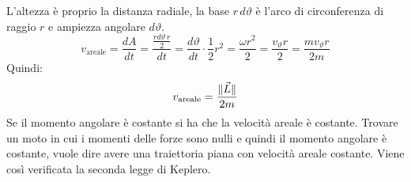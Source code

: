 \documentclass[10pt,a4paper]{book}
\DeclarePairedDelimiter{\norma}{\lVert}{\rVert} %
\begin{document}
\begin{figure}[htpb]
\end{figure}
\FloatBarrier
L'altezza è proprio la distanza radiale, la base $r\,d\vartheta$ è l'arco di circonferenza di raggio $r$ e ampiezza angolare $d\vartheta$.
\[
	v_\text{areale}=\frac{dA}{dt}=\frac{\frac{rd\vartheta\,r}{2}}{dt}=\frac{d\vartheta}{dt}\cdot \frac{1}{2} r^2=\frac{\omega r^2}{2}=\frac{v_\vartheta r}{2}=\frac{mv_\vartheta r}{2m}
\]
Quindi:
\[
	v_\text{areale}=\frac{\norma{\vec{L}}}{2m}
\]
Se il momento angolare è costante si ha che la velocità areale è costante. Trovare un moto in cui i momenti delle forze sono nulli e quindi il momento angolare è costante, vuole dire avere una traiettoria piana con velocità areale costante. Viene così verificata la seconda legge di Keplero.
\end{document}
